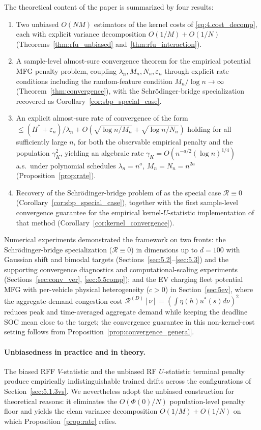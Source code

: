 \documentclass[11pt,leqno]{article}
\theoremstyle{plain}
\theoremstyle{remark}
\theoremstyle{definition}
\numberwithin{equation}{section}
\numberwithin{figure}{section}
\numberwithin{table}{section}
\numberwithin{algorithm}{section}
\begin{document}
The theoretical content of the paper is summarized by four results:
\begin{enumerate}[label=(\arabic*)]
\item Two unbiased $O(NM)$ estimators of the kernel costs of \eqref{eq:4.cost_decomp},
each with explicit variance decomposition $O(1/M)+O(1/N)$
(Theorems~\ref{thm:rfu_unbiased} and~\ref{thm:rfu_interaction}).
\item A sample-level almost-sure convergence theorem for the empirical potential MFG penalty problem,
coupling $\lambda_n,M_n,N_n,\varepsilon_n$ through explicit rate conditions
including the random-feature condition $M_n/\log n\to\infty$ (Theorem~\ref{thm:convergence}),
with the Schr{\"o}dinger-bridge specialization recovered as Corollary~\ref{cor:sbp_special_case}.
\item An explicit almost-sure rate of convergence of the form
$\le(H^*+\varepsilon_n)/\lambda_n+O(\sqrt{\log n/M_n}+\sqrt{\log n/N_n})$
holding for all sufficiently large $n$, for both the observable empirical penalty and the population $\gamma_K^2$,
yielding an algebraic rate $\gamma_K=O(n^{-a/2}(\log n)^{1/4})$ a.s.\
under polynomial schedules $\lambda_n=n^a$, $M_n=N_n=n^{2a}$ (Proposition~\ref{prop:rate}).
\item Recovery of the Schr{\"o}dinger-bridge problem of \cite{nak:2024sb} as the special case $\mathcal{R}\equiv 0$
(Corollary~\ref{cor:sbp_special_case}),
together with the first sample-level convergence guarantee for the empirical kernel-$U$-statistic implementation of that method
(Corollary~\ref{cor:kernel_convergence}).
\end{enumerate}
Numerical experiments demonstrated the framework on two fronts:
the Schr{\"o}dinger-bridge specialization ($\mathcal{R}\equiv 0$) in dimensions up to $d=100$
with Gaussian shift and bimodal targets (Sections~\ref{sec:5.2}--\ref{sec:5.3})
and the supporting convergence diagnostics and computational-scaling experiments
(Sections~\ref{sec:conv_ver}, \ref{sec:5.5comp});
and the EV charging fleet potential MFG with per-vehicle physical heterogeneity ($c>0$) in Section~\ref{sec:5ev},
where the aggregate-demand congestion cost $\mathcal{R}^{(D)}[\nu]=(\int \eta(h)u^{\!*}(s)d\nu)^2$
reduces peak and time-averaged aggregate demand
while keeping the deadline SOC mean close to the target;
the convergence guarantee in this non-kernel-cost setting follows from Proposition~\ref{prop:convergence_general}.

\paragraph{Unbiasedness in practice and in theory.}
The biased RFF $V$-statistic and the unbiased RF $U$-statistic terminal penalty produce empirically indistinguishable trained drifts across the configurations of Section~\ref{sec:5.1.3vs}.
We nevertheless adopt the unbiased construction for theoretical reasons:
it eliminates the $O(\Phi(0)/N)$ population-level penalty floor and yields the clean variance decomposition $O(1/M)+O(1/N)$
on which Proposition~\ref{prop:rate} relies.
\end{document}
